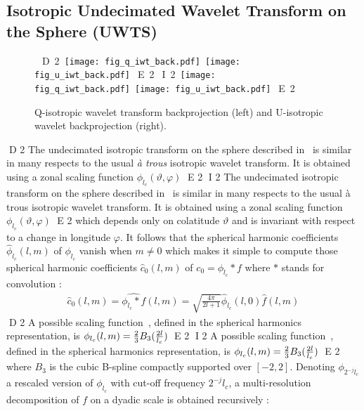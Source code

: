 \subsection{Isotropic Undecimated Wavelet Transform on the Sphere (UWTS) }
\label{sec:UWTS}

\begin{figure*}[htb]
\centerline{
 \hbox{
D 2
 \texttt{[image: fig\_q\_iwt\_back.pdf]}
 \texttt{[image: fig\_u\_iwt\_back.pdf]}
E 2
I 2
 \texttt{[image: fig\_q\_iwt\_back.pdf]}
 \texttt{[image: fig\_u\_iwt\_back.pdf]}
E 2
 }
 }
\caption{Q-isotropic wavelet transform backprojection (left) and U-isotropic wavelet backprojection (right).}
\label{fig_qu_iwt_back}
\end{figure*}


D 2
The undecimated isotropic transform on the sphere described in~\cite{starck:sta05_2} is similar in many respects to the usual 
\emph{ \`a trous} isotropic wavelet transform. It is obtained using a zonal scaling function $\phi_{l_c}(\vartheta, \varphi)$ 
E 2
I 2
The undecimated isotropic transform on the sphere described in~\citep{starck:sta05_2} is similar in many respects to the usual 
\og{}\`a trous \fg{} isotropic wavelet transform. It is obtained using a zonal scaling function $\phi_{l_c}(\vartheta, \varphi)$ 
E 2
which depends only on colatitude $\vartheta$ and is invariant with respect to a change in longitude $\varphi$. It follows that 
the spherical harmonic coefficients $\hat \phi_{l_c} (l,m)$ of $\phi_{l_c}$ vanish when $m \ne 0$ which makes it simple to compute 
those spherical harmonic coefficients $\hat c_{0}(l,m)$ of $c_0 = \phi_{l_c} * f$ where $*$ stands for convolution :
\begin{eqnarray}
 \hat c_{0}(l,m) = \widehat{\phi_{l_c} * f} (l,m) = \sqrt{\frac{4\pi}{2l+1} } \hat \phi_{l_c} (l,0) \hat f(l,m) 
\end{eqnarray}
D 2
A possible scaling function~\cite{starck:book98}, defined in the spherical harmonics representation, is $\phi_{l_c}(l, m) = {2 \over 3} B_{3} ( { {2 l} \over {l_{c} } } )$ 
E 2
I 2
A possible scaling function~\citep{starck:book98}, defined in the spherical harmonics representation, is $\phi_{l_c}(l, m) = {2 \over 3} B_{3} ( { {2 l} \over {l_{c} } } )$ 
E 2
where $B_{3}$ is the cubic B-spline compactly supported over $[-2, 2]$. Denoting $\phi_{2^{-j} l_{c} }$ a rescaled version of 
$\phi_{l_{c}}$ with cut-off frequency $2^{-j} l_{c}$, a multi-resolution decomposition of $f$ on a dyadic scale is obtained recursively : 

